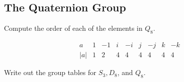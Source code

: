 \newpage

\subsection{The Quaternion Group}

\begin{exercise}\label{ex1.5.1}
    Compute the order of each of the elements in $Q_8$.
\end{exercise}

\begin{sol}
    \[\begin{array}{c|c|c|c|c|c|c|c|c}
        a & 1 & -1 & i & -i & j & -j & k & -k \\
        \hline
        |a| & 1 & 2 & 4 & 4 & 4 & 4 & 4 & 4
    \end{array}\]
\end{sol}

\begin{exercise}\label{ex1.5.2}
    Write out the group tables for $S_3, D_8$, and $Q_8$.
\end{exercise}

